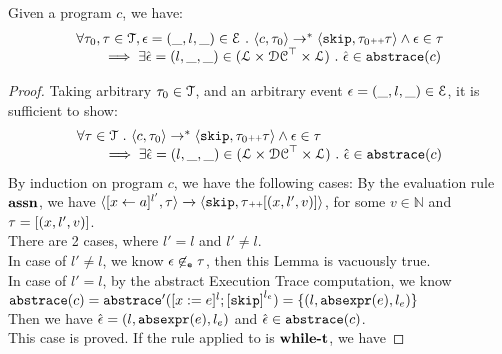 \begin{lem}
  Given a program ${c}$, we have:
  \[
    \begin{array}{l}
      \forall \mathtt{\tau}_0, \mathtt{\tau} \in \mathcal{T} ,  \mathtt{\epsilon} = (\_, l, \_) \in \mathcal{E} ~.~
  \langle {c}, \mathtt{\tau}_0 \rangle \to^{*} \langle \mathtt{skip}, \mathtt{\tau}_0 {\scriptscriptstyle ++} \mathtt{\tau} \rangle 
  \land \mathtt{\epsilon} \in \mathtt{\tau} 
  \\
  \qquad \implies \exists \hat{\mathtt{\epsilon}{}} = (l, \_, \_) \in (\mathcal{L}\times \mathcal{DC}^{\top} \times \mathcal{L}) ~.~ 
  \hat{\mathtt{\epsilon}{}} \in \mathtt{abs}{\mathtt{trace}}(c)
  \end{array}
  \]
  \end{lem}
  \begin{proof}
    Taking arbitrary $\mathtt{\tau}_0 \in \mathcal{T}$, and an arbitrary event $\mathtt{\epsilon} = (\_, l, \_) \in \mathcal{E}$, it is sufficient to show:
    \[
    \begin{array}{l}
      \forall \mathtt{\tau} \in \mathcal{T} ~.~
  \langle {c}, \mathtt{\tau}_0 \rangle \to^{*} \langle \mathtt{skip}, \mathtt{\tau}_0 {\scriptscriptstyle ++} \mathtt{\tau} \rangle 
  \land \mathtt{\epsilon} \in \mathtt{\tau} 
  \\
  \qquad \implies 
  \exists \hat{\mathtt{\epsilon}{}} = (l, \_, \_) \in (\mathcal{L}\times \mathcal{DC}^{\top} \times \mathcal{L}) ~.~ 
  \hat{\mathtt{\epsilon}{}} \in \mathtt{abs}{\mathtt{trace}}(c)
  \end{array}
  \]
    By induction on program $c$, we have the following cases:
    By the evaluation rule $\rname{assn}$, we have
    $
    {
    \langle [\mathrel{ {x} \leftarrow a }]^{l'},  \mathtt{\tau}  \rangle 
    \xrightarrow{} 
    \langle \mathtt{skip}, \mathtt{\tau} {\scriptscriptstyle ++} [({x}, l', v) ] \rangle
    }$, for some $v \in \mathbb{N}$ and $\mathtt{\tau} = [({x}, l', v) ]$.
    \\
    There are 2 cases, where $l' = l$ and $l' \neq l$.
    \\
    In case of $l' \neq l$, we know $\mathtt{\epsilon} \not\in_{\mathtt{e}} \mathtt{\tau}$, then this Lemma is vacuously true.
      \\
      In case of $l' = l$, by the abstract Execution Trace computation, we know 
      $\absflow(c) = \absflow'([x := \expr]^{l}; \clabel{\eskip}^{l_e}) = \{(l, \absexpr(\expr), l_e)\}$  
      \\
    Then we have $\hat{\mathtt{\epsilon}{}} = (l, \mathtt{abs}{\mathtt{expr}}(e), l_e) $ and $\hat{\mathtt{\epsilon}{}} \in \mathtt{abs}{\mathtt{trace}}(c)$.
    \\
    This case is proved.
    If the rule applied to is $\rname{while-t}$, we have

\end{proof}
